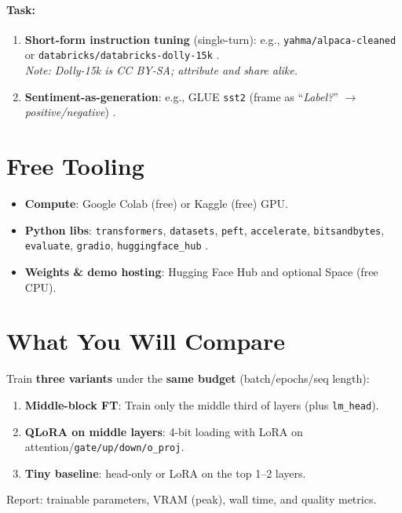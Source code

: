 \documentclass[11pt]{article}
\begin{document}
\paragraph{Task:}
\begin{enumerate}[label=\arabic*)]
  \item \textbf{Short-form instruction tuning} (single-turn): e.g., \texttt{yahma/alpaca-cleaned} \cite{alpaca-cleaned} or \texttt{databricks/databricks-dolly-15k} \cite{dolly15k}.\\
        \emph{Note: Dolly-15k is CC BY-SA; attribute and share alike.}
  \item \textbf{Sentiment-as-generation}: e.g., GLUE \texttt{sst2} (frame as ``\emph{Label?}'' $\rightarrow$ \emph{positive/negative}) \cite{glue}.
\end{enumerate}

\section*{Free Tooling}
\begin{itemize}
  \item \textbf{Compute}: Google Colab (free) or Kaggle (free) GPU.
  \item \textbf{Python libs}: \texttt{transformers}, \texttt{datasets}, \texttt{peft}, \texttt{accelerate}, \texttt{bitsandbytes}, \texttt{evaluate}, \texttt{gradio}, \texttt{huggingface\_hub} \cite{wolf2020transformers,hfhub,bitsandbytes,gradio}.
  \item \textbf{Weights \& demo hosting}: Hugging Face Hub and optional Space (free CPU).
\end{itemize}

\section*{What You Will Compare}
Train \textbf{three variants} under the \textbf{same budget} (batch/epochs/seq length):
\begin{enumerate}[label=\textbf{V\arabic*)}]
  \item \textbf{Middle-block FT}: Train only the middle third of layers (plus \texttt{lm\_head}).
  \item \textbf{QLoRA on middle layers}: 4-bit loading with LoRA on attention/\texttt{gate/up/down/o\_proj}.
  \item \textbf{Tiny baseline}: head-only or LoRA on the top 1--2 layers.
\end{enumerate}
Report: trainable parameters, VRAM (peak), wall time, and quality metrics.
\end{document}
